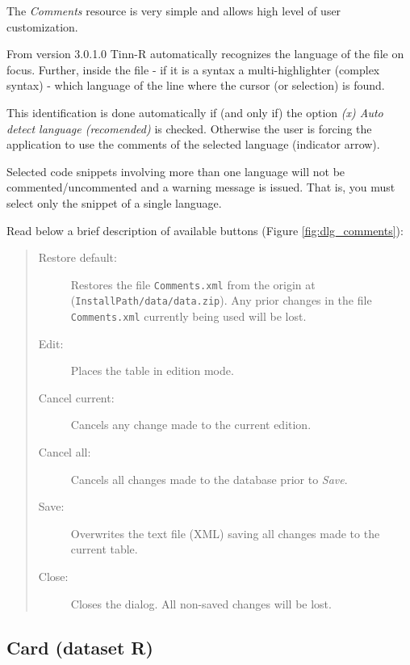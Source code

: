 The \textit{Comments} resource is very simple and allows high level
of user customization.

From version 3.0.1.0 Tinn-R automatically recognizes the
language of the file on focus. Further, inside the file
- if it is a syntax a multi-highlighter (complex syntax) - which language of
the line where the cursor (or selection) is found.

This identification is done automatically if (and only if) the option
\textit{(x) Auto detect language (recomended)} is checked. Otherwise
the user is forcing the application to use the comments of the selected language
(indicator arrow).

Selected code snippets involving more than one language will not be commented/uncommented
and a warning message is issued. That is, you must select only the snippet of a single language.

Read below a brief description of available buttons (Figure \ref{fig:dlg_comments}):

\begin{quote}
  \begin{footnotesize}
    \begin{description}
      \item[Restore default:]
        Restores the file \texttt{Comments.xml} from the origin at
        (\texttt{InstallPath/data/data.zip}). Any prior changes in the
        file \texttt{Comments.xml} currently being used will be lost.
      \item[Edit:]
        Places the table in edition mode.
      \item[Cancel current:]
        Cancels any change made to the current edition.
      \item[Cancel all:]
        Cancels all changes made to the database prior to \textit{Save}.
      \item[Save:]
        Overwrites the text file (XML) saving all changes made to the current table.
      \item[Close:]
        Closes the dialog. All non-saved changes will be lost.
    \end{description}
  \end{footnotesize}
\end{quote}


\subsection{Card (dataset R)}

